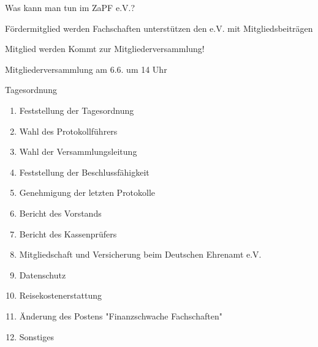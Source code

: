 \documentclass[compress, aspectratio=169]{beamer}
\begin{document}
\begin{frame}{Was kann man tun im ZaPF e.V.?}
  \begin{block}{Fördermitglied werden}
    Fachschaften unterstützen den e.V. mit Mitgliedsbeiträgen
  \end{block}
  \begin{block}{Mitglied werden}
    Kommt zur Mitgliederversammlung!
  \end{block}
\end{frame}
  
\begin{frame}{Mitgliederversammlung am 6.6. um 14 Uhr}
  \begin{block}{Tagesordnung}
    \begin{multicols}{2}
      \begin{enumerate}\small
        \item Feststellung der Tagesordnung
        \item Wahl des Protokollführers
        \item Wahl der Versammlungsleitung
        \item Feststellung der Beschlussfähigkeit
        \item Genehmigung der letzten Protokolle
        \item Bericht des Vorstands
        \item Bericht des Kassenprüfers
        \item Mitgliedschaft und Versicherung beim Deutschen Ehrenamt e.V.
        \item Datenschutz
        \item Reisekostenerstattung
        \item Änderung des Postens "Finanzschwache Fachschaften"
        \item Sonstiges
      \end{enumerate}
    \end{multicols}
  \end{block}
\end{frame}
\end{document}
